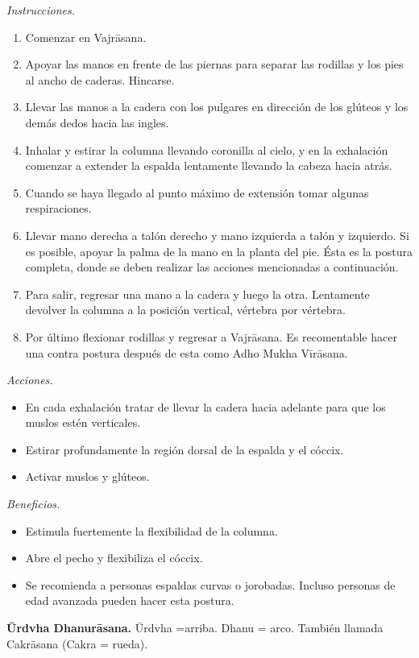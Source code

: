 \emph{Instrucciones.}
\begin{enumerate}
\item Comenzar en Vajrāsana.
\item Apoyar las manos en frente de las
piernas para separar las rodillas y los pies
al ancho de caderas. Hincarse.
\item Llevar las manos a la cadera con los
pulgares en dirección de los glúteos y los
demás dedos hacia las ingles.
\item Inhalar y estirar la columna llevando
coronilla al cielo, y en la exhalación
comenzar a extender la espalda lentamente
llevando la cabeza hacia atrás.
\item Cuando se haya llegado al punto máximo
de extensión tomar algunas respiraciones.
\item Llevar mano derecha a talón derecho y
mano izquierda a talón y izquierdo. Si es
posible, apoyar la palma de la mano en la
planta del pie. Ésta es la postura completa,
donde se deben realizar las acciones
mencionadas a continuación.
\item Para salir, regresar una mano a la
cadera y luego la otra. Lentamente devolver
la columna a la posición vertical, vértebra
por vértebra.
\item Por último flexionar rodillas y
regresar a Vajrāsana. Es recomentable hacer
una contra postura después de esta como Adho
Mukha Vīrāsana.
\end{enumerate}

\emph{Acciones.}
\begin{itemize}
\item En cada exhalación tratar de llevar la
cadera hacia adelante para que los muslos
estén verticales.
\item Estirar profundamente la región dorsal
de la espalda y el cóccix.
\item Activar muslos y glúteos.
\end{itemize}

\emph{Beneficios.}
\begin{itemize}
\item Estimula fuertemente la flexibilidad de
la columna.
\item Abre el pecho y flexibiliza el cóccix.
\item Se recomienda a personas espaldas
curvas o jorobadas. Incluso personas de edad
avanzada pueden hacer esta postura.
\end{itemize}

\medskip\noindent\textbf{Ūrdvha Dhanurāsana.}
Ūrdvha =arriba. Dhanu = arco. También llamada
Cakrāsana (Cakra = rueda).

